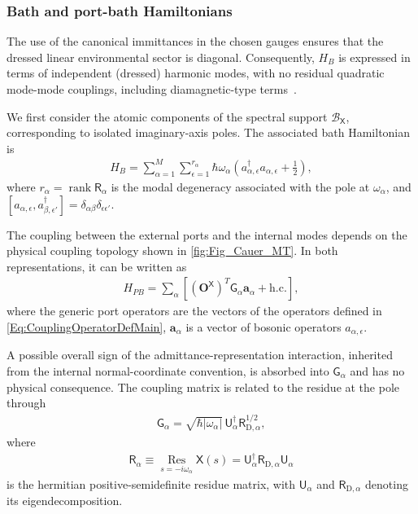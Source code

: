 \documentclass[prx,aps,twocolumn,article]{revtex4-2}
\newcommand{\msf}[1]{\mathsf{#1}}
\newcommand{\bsb}[1]{\boldsymbol{#1}}
\newcommand{\bO}{\bsb{O}}
\newcommand{\ba}{\bsb{a}}
\newcommand{\msG}{\msf{G}}
\newcommand{\msU}{\msf{U}}
\newcommand{\msX}{\msf{X}}
\newcommand{\msR}{\msf{R}}
\begin{document}
\subsubsection{Bath and port-bath Hamiltonians}

The use of the canonical immittances in the chosen gauges ensures that the dressed linear environmental sector is diagonal. Consequently, $H_B$ is expressed in terms of independent (dressed) harmonic modes, with no residual quadratic mode-mode couplings, including diamagnetic-type terms~\cite{Paladino:2003,ParraRodriguez:2018}.


We first consider the atomic components of the spectral support $\mathcal B_{\msX}$, corresponding to isolated imaginary-axis poles. The associated bath Hamiltonian is
\begin{align}
    H_B
    =
    \sum_{\alpha=1}^{M}
    \sum_{\epsilon=1}^{r_\alpha}
    \hbar\omega_\alpha
    \left(
        a_{\alpha,\epsilon}^\dagger a_{\alpha,\epsilon}
        +\frac{1}{2}
    \right),\label{Eq:DiscreteInternalModeHamiltonianMaintext}
\end{align}
where $r_\alpha=\operatorname{rank}\msR_\alpha$ is the modal degeneracy associated with the pole at $\omega_\alpha$, and $[a_{\alpha,\epsilon},a_{\beta,\epsilon'}^\dagger]=\delta_{\alpha\beta}\delta_{\epsilon\epsilon'}$. 

The coupling between the external ports and the internal modes depends on the physical coupling topology shown in \cref{fig:Fig_Cauer_MT}. In both representations, it can be written as
\begin{align}
H_{PB}=\sum_\alpha\left[(\bO^\msX)^T\msG_\alpha\ba_\alpha + \text{h.c.}\right],
\label{Eq:CouplingHamiltonianDiscreteMaintext}
\end{align}
where the generic port operators are the vectors of the operators defined in \cref{Eq:CouplingOperatorDefMain}, $\ba_\alpha$ is a vector of bosonic operators $a_{\alpha,\epsilon}$.

A possible overall sign of the admittance-representation interaction, inherited from the internal normal-coordinate convention, is absorbed into
$\msG_\alpha$ and has no physical consequence. The coupling matrix is related to the residue at the pole through
\begin{align}
    \msG_\alpha
    =
    \sqrt{\hbar|\omega_\alpha|}\,
    \msU_\alpha^\dagger
    \msR_{\mathrm D,\alpha}^{1/2},
    \label{Eq:G_alpha_discreteCoupling}
\end{align}
where
\begin{align}
    \msR_\alpha \equiv\underset{s=-i\omega_\alpha}{\operatorname{Res}}\msX(s)
    = \msU_\alpha^\dagger \msR_{\mathrm D,\alpha}\msU_\alpha
    \label{Eq:ResidueDiscreteMaintext}
\end{align}
is the hermitian positive-semidefinite residue matrix, with
$\msU_\alpha$ and $\msR_{\mathrm D,\alpha}$ denoting its eigendecomposition.
\end{document}
